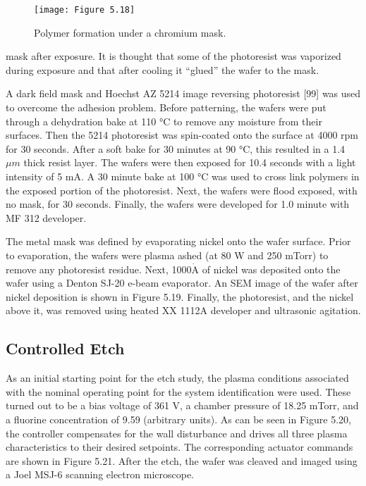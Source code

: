 \begin{figure}[H]
	\centering	
	\texttt{[image: Figure 5.18]}
	\bf\caption{ Polymer formation under a chromium mask.}
	\label{fig:5.18}
\end{figure}

\noindent mask after exposure. It is thought that some of the photoresist was vaporized during exposure and that after cooling it “glued” the wafer to the mask.

A dark field mask and Hoechst AZ 5214 image reversing photoresist [99] was used to overcome the adhesion problem. Before patterning, the wafers were put through a dehydration bake at 110 °C to remove any moisture from their surfaces. Then the 5214 photoresist was spin-coated onto the surface at 4000 rpm for 30 seconds. After a soft bake for 30 minutes at 90 °C, this resulted in a 1.4 $\mu m$ thick resist layer. The wafers were then exposed for 10.4 seconds with a light intensity of 5 mA. A 30 minute bake at 100 °C was used to cross link polymers in the exposed portion of the photoresist. Next, the wafers were flood exposed, with no mask, for 30 seconds. Finally, the wafers were developed for 1.0 minute with MF 312 developer.

The metal mask was defined by evaporating nickel onto the wafer surface. Prior to evaporation, the wafers were plasma ashed (at 80 W and 250 mTorr) to remove any photoresist residue. Next, 1000$\dot{\text{A}}$ of nickel was deposited onto the wafer using a Denton SJ-20 e-beam evaporator. An SEM image of the wafer after nickel deposition is shown in Figure 5.19. Finally, the photoresist, and the nickel above it, was removed using heated XX 1112A developer and ultrasonic agitation.

\subsection{Controlled Etch}

\tab As an initial starting point for the etch study, the plasma conditions associated with
the nominal operating point for the system identification were used. These turned out to
be a bias voltage of 361 V, a chamber pressure of 18.25 mTorr, and a fluorine concentration
of 9.59 (arbitrary units). As can be seen in Figure 5.20, the controller compensates for the
wall disturbance and drives all three plasma characteristics to their desired setpoints. The
corresponding actuator commands are shown in Figure 5.21. After the etch, the wafer was
cleaved and imaged using a Joel MSJ-6 scanning electron microscope.

